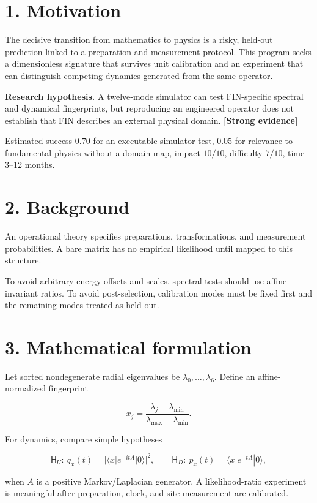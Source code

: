 \documentclass[11pt,a4paper,openany]{report}
\newcommand{\statusStrong}{\textcolor{finblue}{[Strong evidence]}}
\begin{document}
\section{1. Motivation}

The decisive transition from mathematics to physics is a risky, held-out prediction linked to a preparation and measurement protocol. This program seeks a dimensionless signature that survives unit calibration and an experiment that can distinguish competing dynamics generated from the same operator.

\textbf{Research hypothesis.} A twelve-mode simulator can test FIN-specific spectral and dynamical fingerprints, but reproducing an engineered operator does not establish that FIN describes an external physical domain. \textbf{\statusStrong{}}

Estimated success \(0.70\) for an executable simulator test, \(0.05\) for relevance to fundamental physics without a domain map, impact \(10/10\), difficulty \(7/10\), time 3–12 months.

\section{2. Background}

An operational theory specifies preparations, transformations, and measurement probabilities. A bare matrix has no empirical likelihood until mapped to this structure.

To avoid arbitrary energy offsets and scales, spectral tests should use affine-invariant ratios. To avoid post-selection, calibration modes must be fixed first and the remaining modes treated as held out.

\section{3. Mathematical formulation}

Let sorted nondegenerate radial eigenvalues be \(\lambda_0,\ldots,\lambda_6\). Define an affine-normalized fingerprint

\[
x_j=\frac{\lambda_j-\lambda_{\min}}
{\lambda_{\max}-\lambda_{\min}}.
\]

For dynamics, compare simple hypotheses

\[
\mathsf H_U:\ q_x(t)=|\langle x|e^{-itA}|0\rangle|^2,
\qquad
\mathsf H_D:\ p_x(t)=\langle x|e^{-tA}|0\rangle,
\]

when \(A\) is a positive Markov/\allowbreak{}Laplacian generator. A likelihood-ratio experiment is meaningful after preparation, clock, and site measurement are calibrated.
\end{document}
